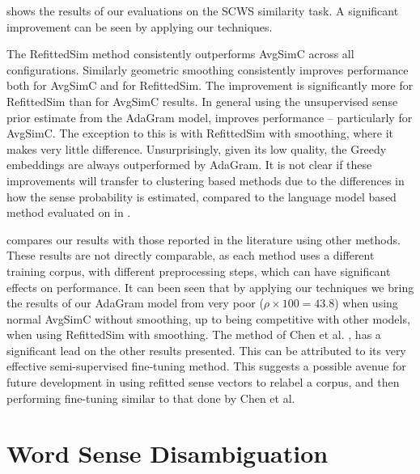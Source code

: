 { shows the results of our evaluations on the SCWS similarity task.
A significant improvement can be seen by applying our techniques.

The RefittedSim method consistently outperforms AvgSimC across all configurations.
Similarly geometric smoothing consistently improves performance both for AvgSimC and for RefittedSim.
The improvement is significantly more for RefittedSim than for AvgSimC results.
In general using the unsupervised sense prior estimate from the AdaGram model, improves performance -- particularly for AvgSimC.
The exception to this is with RefittedSim with smoothing, where it makes very little difference.
Unsurprisingly, given its low quality, the Greedy embeddings are always outperformed by AdaGram.
It is not clear if these improvements will transfer to clustering based methods due to the differences in how the sense probability is estimated, compared to the language model based method evaluated on in .



 compares our results with those reported in the literature using other methods.
These results are not directly comparable, as each method uses a different training corpus, with different preprocessing steps,  which can have significant effects on performance.
It can been seen that by applying our techniques we bring the results of our AdaGram model from very poor ($\rho \times 100 = 43.8$) when using normal AvgSimC without smoothing, 
up to being competitive with other models, when using RefittedSim with smoothing.
The method of Chen et al. \parencite{Chen2014}, has a significant lead on the other results presented.
This can be attributed to its very effective semi-supervised fine-tuning method.
This suggests a possible avenue for future development in using refitted sense vectors to  relabel a corpus, and then performing fine-tuning similar to that done by Chen et al.


\section{Word Sense Disambiguation}\label{lexicalWSD}

}
